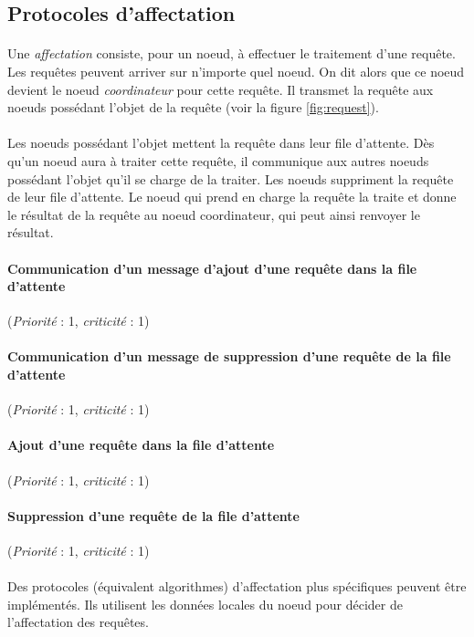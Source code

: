 \documentclass[12pt]{article}
\newcommand{\besoin}[2] {
  (\textit{Priorité} : #1, \textit{criticité} : #2)
}
\begin{document}
\subsection{Protocoles d'affectation}

\paragraph{} Une \textit{affectation} consiste, pour un noeud, à effectuer le traitement d'une requête. Les requêtes peuvent arriver sur n'importe quel noeud. On dit alors que ce noeud devient le noeud \textit{coordinateur} pour cette requête. Il transmet la requête aux noeuds possédant l'objet de la requête (voir la figure \ref{fig:request}).

\paragraph{} Les noeuds possédant l'objet mettent la requête dans leur file d'attente. Dès qu'un noeud aura à traiter cette requête, il communique aux autres noeuds possédant l'objet qu'il se charge de la traiter. Les noeuds suppriment la requête de leur file d'attente. Le noeud qui prend en charge la requête la traite et donne le résultat de la requête au noeud coordinateur, qui peut ainsi renvoyer le résultat.

\paragraph{Communication d'un message d'ajout d'une requête dans la file d'attente} \besoin{1}{1}
\paragraph{Communication d'un message de suppression d'une requête de la file d'attente} \besoin{1}{1}
\paragraph{Ajout d'une requête dans la file d'attente} \besoin{1}{1}
\paragraph{Suppression d'une requête de la file d'attente} \besoin{1}{1}

\paragraph{} Des protocoles (équivalent algorithmes) d'affectation plus spécifiques peuvent être implémentés. Ils utilisent les données locales du noeud pour décider de l'affectation des requêtes.
\end{document}
